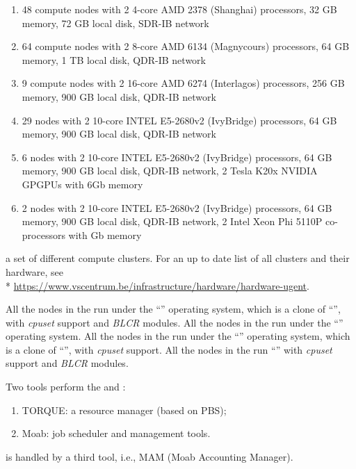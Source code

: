 \fi
\ifbrussel
  \begin{enumerate}
    \item  48 compute nodes with 2 4-core AMD 2378 (Shanghai) processors, 32 GB
    memory, 72 GB local disk, SDR-IB network
    \item  64 compute nodes with 2 8-core AMD 6134 (Magnycours) processors, 64
    GB memory, 1 TB local disk, QDR-IB network
    \item  9 compute nodes with 2 16-core AMD 6274 (Interlagos) processors, 256
    GB memory, 900 GB local disk, QDR-IB network
    \item  29 nodes with 2 10-core INTEL E5-2680v2 (IvyBridge) processors, 64
    GB memory, 900 GB local disk, QDR-IB network
    \item  6 nodes with 2 10-core INTEL E5-2680v2 (IvyBridge) processors, 64 GB
    memory, 900 GB local disk, QDR-IB network, 2 Tesla K20x NVIDIA GPGPUs with
    6Gb memory
    \item  2 nodes with 2 10-core INTEL E5-2680v2 (IvyBridge) processors, 64 GB
    memory, 900 GB local disk, QDR-IB network, 2 Intel Xeon Phi 5110P
    co-processors with Gb memory
  \end{enumerate}
\fi
\ifgent
  a set of different compute clusters. For an up to date list of all clusters and their hardware, see\\*
  \url{https://www.vscentrum.be/infrastructure/hardware/hardware-ugent}.
\fi

\ifantwerpen
All the nodes in the \hpc run under the ``\operatingsystemSL'' operating
system, which is a clone of ``\operatingsystemRHEL'',
with \emph{cpuset} support and \emph{BLCR} modules.
\fi
\ifleuven
All the nodes in the \hpc run under the ``\operatingsystem'' operating system.
\fi
\ifbrussel
All the nodes in the \hpc run under the ``\operatingsystemSL'' operating
system, which is a clone of ``\operatingsystemRHEL'',
with \emph{cpuset} support.
\fi
\ifgent
All the nodes in the \hpc run ``\operatingsystem''
with \emph{cpuset} support and \emph{BLCR} modules.
\fi

Two tools perform the  and :
\begin{enumerate}
  \item  TORQUE: a resource manager (based on PBS);
  \item  Moab: job scheduler and management tools.
\end{enumerate}
\ifantwerpen
\fi
\ifleuven
{} is handled by a third tool, i.e., MAM (Moab Accounting
Manager).
\fi

